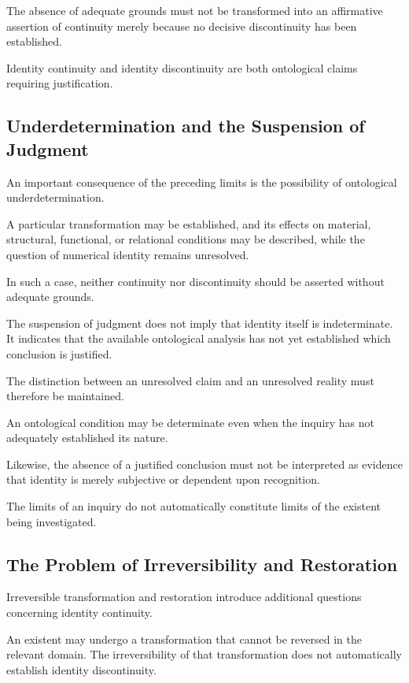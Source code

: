 The absence of adequate grounds must not be
transformed into an affirmative assertion of
continuity merely because no decisive discontinuity
has been established.

Identity continuity and identity discontinuity
are both ontological claims requiring justification.

\subsection{Underdetermination and the Suspension of Judgment}

An important consequence of the preceding limits
is the possibility of ontological underdetermination.

A particular transformation may be established,
and its effects on material, structural, functional,
or relational conditions may be described, while
the question of numerical identity remains unresolved.

In such a case, neither continuity nor discontinuity
should be asserted without adequate grounds.

The suspension of judgment does not imply that
identity itself is indeterminate. It indicates
that the available ontological analysis has not
yet established which conclusion is justified.

The distinction between an unresolved claim and
an unresolved reality must therefore be maintained.

An ontological condition may be determinate even
when the inquiry has not adequately established
its nature.

Likewise, the absence of a justified conclusion
must not be interpreted as evidence that identity
is merely subjective or dependent upon recognition.

The limits of an inquiry do not automatically
constitute limits of the existent being investigated.

\subsection{The Problem of Irreversibility and Restoration}

Irreversible transformation and restoration introduce
additional questions concerning identity continuity.

An existent may undergo a transformation that
cannot be reversed in the relevant domain. The
irreversibility of that transformation does not
automatically establish identity discontinuity.

